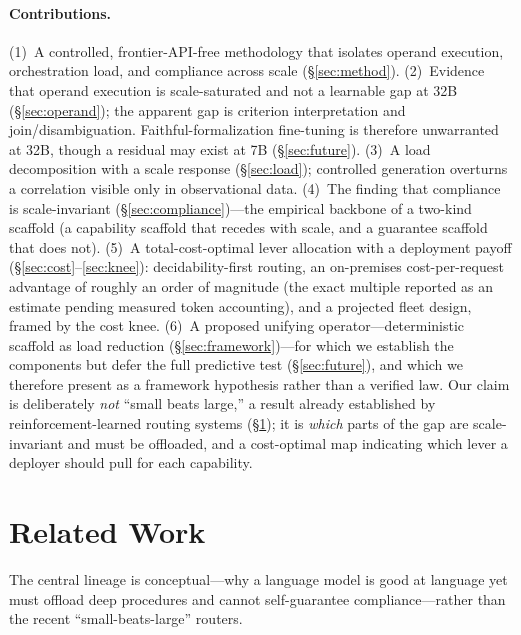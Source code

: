 \documentclass[10pt]{article}
\begin{document}
\paragraph{Contributions.}
(1)~A controlled, frontier-API-free methodology that isolates operand execution, orchestration load, and compliance across scale (\S\ref{sec:method}).
(2)~Evidence that operand execution is scale-saturated and not a learnable gap at 32B (\S\ref{sec:operand}); the apparent gap is criterion interpretation and join/disambiguation. Faithful-formalization fine-tuning is therefore unwarranted at 32B, though a residual may exist at 7B (\S\ref{sec:future}).
(3)~A load decomposition with a scale response (\S\ref{sec:load}); controlled generation overturns a correlation visible only in observational data.
(4)~The finding that compliance is scale-invariant (\S\ref{sec:compliance})---the empirical backbone of a two-kind scaffold (a capability scaffold that recedes with scale, and a guarantee scaffold that does not).
(5)~A total-cost-optimal lever allocation with a deployment payoff (\S\ref{sec:cost}--\ref{sec:knee}): decidability-first routing, an on-premises cost-per-request advantage of roughly an order of magnitude (the exact multiple reported as an estimate pending measured token accounting), and a projected fleet design, framed by the cost knee.
(6)~A proposed unifying operator---deterministic scaffold as load reduction (\S\ref{sec:framework})---for which we establish the components but defer the full predictive test (\S\ref{sec:future}), and which we therefore present as a framework hypothesis rather than a verified law.
Our claim is deliberately \emph{not} ``small beats large,'' a result already established by reinforcement-learned routing systems (\S\ref{sec:related}); it is \emph{which} parts of the gap are scale-invariant and must be offloaded, and a cost-optimal map indicating which lever a deployer should pull for each capability.

\section{Related Work}\label{sec:related}
The central lineage is conceptual---why a language model is good at language yet must offload deep procedures and cannot self-guarantee compliance---rather than the recent ``small-beats-large'' routers.
\end{document}
